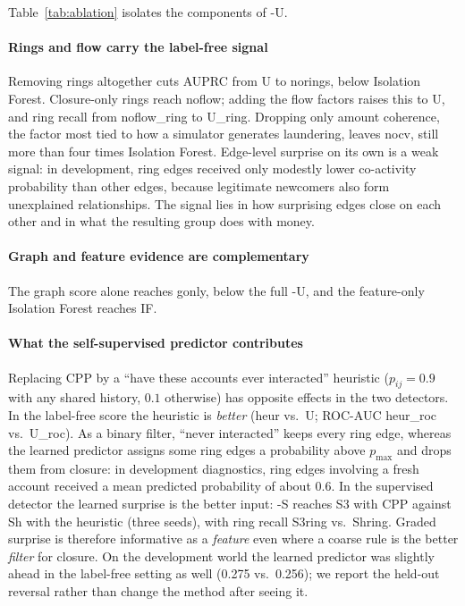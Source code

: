 Table~\ref{tab:ablation} isolates the components of \coral{}-U.

\paragraph{Rings and flow carry the label-free signal}
Removing rings altogether cuts AUPRC from {{U}} to {{norings}}, below Isolation Forest. Closure-only rings reach {{noflow}}; adding the flow factors raises this to {{U}}, and ring recall from {{noflow_ring}} to {{U_ring}}. Dropping only amount coherence, the factor most tied to how a simulator generates laundering, leaves {{nocv}}, still more than four times Isolation Forest. Edge-level surprise on its own is a weak signal: in development, ring edges received only modestly lower co-activity probability than other edges, because legitimate newcomers also form unexplained relationships. The signal lies in how surprising edges close on each other and in what the resulting group does with money.

\paragraph{Graph and feature evidence are complementary}
The graph score alone reaches {{gonly}}, below the full \coral{}-U, and the feature-only Isolation Forest reaches {{IF}}.

\paragraph{What the self-supervised predictor contributes}
Replacing CPP by a ``have these accounts ever interacted'' heuristic ($p_{ij}=0.9$ with any shared history, $0.1$ otherwise) has opposite effects in the two detectors. In the label-free score the heuristic is \emph{better} ({{heur}} vs.\ {{U}}; ROC-AUC {{heur_roc}} vs.\ {{U_roc}}). As a binary filter, ``never interacted'' keeps every ring edge, whereas the learned predictor assigns some ring edges a probability above $p_{\max}$ and drops them from closure: in development diagnostics, ring edges involving a fresh account received a mean predicted probability of about 0.6. In the supervised detector the learned surprise is the better input: \coral{}-S reaches {{S3}} with CPP against {{Sh}} with the heuristic (three seeds), with ring recall {{S3ring}} vs.\ {{Shring}}. Graded surprise is therefore informative as a \emph{feature} even where a coarse rule is the better \emph{filter} for closure. On the development world the learned predictor was slightly ahead in the label-free setting as well (0.275 vs.\ 0.256); we report the held-out reversal rather than change the method after seeing it.

